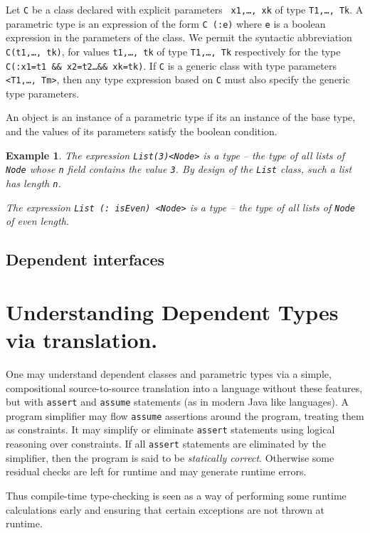 \documentclass{article}
\def\java{{\sf Java}}
\newtheorem{example}{Example}[section]
\begin{document}
Let {\tt C} be a class declared with explicit parameters {\tt
x1,\ldots, xk} of type {\tt T1,\ldots, Tk}.  A parametric type is an
expression of the form {\tt C (:e)} where {\tt e} is a boolean
expression in the parameters of the class. We permit the syntactic
abbreviation {\tt C(t1,\ldots, tk)}, for values {\tt t1,\ldots, tk} of
type {\tt T1,\ldots, Tk} respectively for the type {\tt C(:x1=t1 \&\&
x2=t2\ldots \&\& xk=tk)}.  If {\tt C} is a generic class with type
parameters {\tt <T1,\ldots, Tm>}, then any type expression based on
{\tt C} must also specify the generic type parameters.

An object is an instance of a parametric type if its an instance of
the base type, and the values of its parameters satisfy the boolean
condition. 

{}\begin{example} The expression {\tt List(3)<Node>} is a type -- the
type of all lists of {\tt Node} whose {\tt n} field contains the value
{\tt 3}. By design of the {\tt List} class, such a list has length
{\tt n}.

The expression {\tt List (: isEven) <Node>} is a type -- the type of all
lists of {\tt Node} of even length.
\end{example}

\subsection{Dependent interfaces}

\section{Understanding Dependent Types via translation.}
One may understand dependent classes and parametric types via a
simple, compositional source-to-source translation into a language
without these features, but with {\tt assert} and {\tt assume}
statements (as in modern \java{} like languages). A program simplifier
may flow {\tt assume} assertions around the program, treating them as
constraints. It may simplify or eliminate {\tt assert} statements
using logical reasoning over constraints.  If all {\tt assert}
statements are eliminated by the simplifier, then the program is said
to be {\em statically correct}. Otherwise some residual checks are
left for runtime and may generate runtime errors.

Thus compile-time type-checking is seen as a way of performing some
runtime calculations early and ensuring that certain exceptions are
not thrown at runtime.
\end{document}
